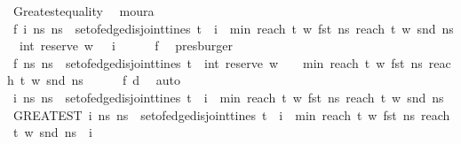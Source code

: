 \begin{isabellebody}
\ Greatest{\isacharunderscore}equality\ \isamarkupfalse%
\ moura\isanewline
\ \ \isamarkupfalse%
\ f{}{\isacharcolon}\ {\isachardoublequoteopen}{\isasymAnd}i{\isachardot}\ {\isacharparenleft}{\isasymforall}ns{\isachardot}\ ns\ {\isasymnotin}\ set{\isacharunderscore}of{\isacharunderscore}edge{\isacharunderscore}disjoint{\isacharunderscore}tines\ t\ {\isasymor}\ i\ {\isasymnoteq}\ min\ {\isacharparenleft}reach\ t\ w\ {\isacharparenleft}fst\ ns{\isacharparenright}{\isacharparenright}\ {\isacharparenleft}reach\ t\ w\ {\isacharparenleft}snd\ ns{\isacharparenright}{\isacharparenright}{\isacharparenright}\ {\isasymor}\ int\ {\isacharparenleft}reserve\ w\ {\isacharbrackleft}{\isacharbrackright}{\isacharparenright}\ {\isacharequal}\ i{\isachardoublequoteclose}\isanewline
\ \ \ \ \isamarkupfalse%
\ f{}\ \isamarkupfalse%
\ presburger\isanewline
\ \ \isamarkupfalse%
\ f{}{\isacharcolon}\ {\isachardoublequoteopen}{\isasymexists}ns{\isachardot}\ ns\ {\isasymin}\ set{\isacharunderscore}of{\isacharunderscore}edge{\isacharunderscore}disjoint{\isacharunderscore}tines\ t\ {\isasymand}\ int\ {\isacharparenleft}reserve\ w\ {\isacharbrackleft}{\isacharbrackright}{\isacharparenright}\ {\isacharequal}\ \ min\ {\isacharparenleft}reach\ t\ w\ {\isacharparenleft}fst\ ns{\isacharparenright}{\isacharparenright}\ {\isacharparenleft}reach\ t\ w\ {\isacharparenleft}snd\ ns{\isacharparenright}{\isacharparenright}{\isachardoublequoteclose}\isanewline
\ \ \ \ \isamarkupfalse%
\ f{}\ d\ \isamarkupfalse%
\ auto\ \isanewline
\ \ \isamarkupfalse%
\ {\isachardoublequoteopen}{\isasymAnd}i{\isachardot}\ {\isacharparenleft}{\isasymforall}ns{\isachardot}\ ns\ {\isasymnotin}\ set{\isacharunderscore}of{\isacharunderscore}edge{\isacharunderscore}disjoint{\isacharunderscore}tines\ t\ {\isasymor}\ i\ {\isasymnoteq}\ min\ {\isacharparenleft}reach\ t\ w\ {\isacharparenleft}fst\ ns{\isacharparenright}{\isacharparenright}\ {\isacharparenleft}reach\ t\ w\ {\isacharparenleft}snd\ ns{\isacharparenright}{\isacharparenright}{\isacharparenright}\ \isanewline
{\isasymor}\ {\isacharparenleft}GREATEST\ i{\isachardot}\ {\isasymexists}ns{\isachardot}\ ns\ {\isasymin}\ set{\isacharunderscore}of{\isacharunderscore}edge{\isacharunderscore}disjoint{\isacharunderscore}tines\ t\ {\isasymand}\ i\ {\isacharequal}\ min\ {\isacharparenleft}reach\ t\ w\ {\isacharparenleft}fst\ ns{\isacharparenright}{\isacharparenright}\ {\isacharparenleft}reach\ t\ w\ {\isacharparenleft}snd\ ns{\isacharparenright}{\isacharparenright}{\isacharparenright}\ {\isacharequal}\ i\ \isanewline

\end{isabellebody}
